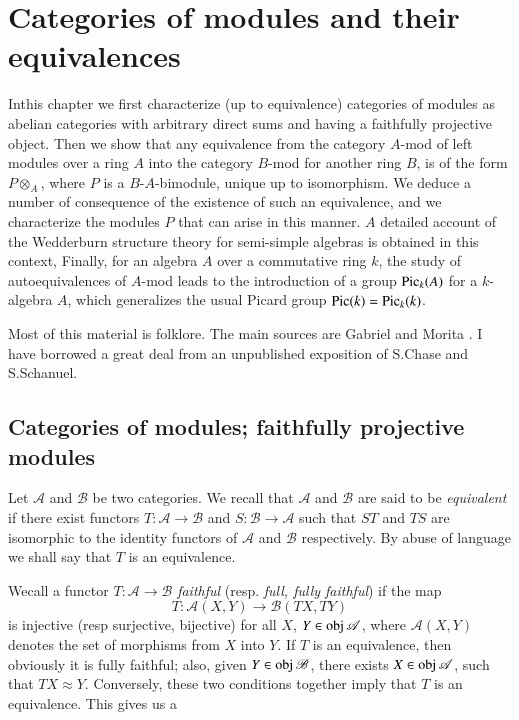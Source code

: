  \chapter{Categories of modules and their equivalences}\label{chap2}
  
In\pageoriginale this chapter we first characterize (up to
equivalence) categories 
of modules as abelian categories  with arbitrary direct sums and
having a faithfully projective object. Then we show that any
equivalence from the category $A$-mod of left modules over a ring
$A$ into  the category $B$-mod for another ring $B$, is of the form
$P \otimes_A$, where $P$ is a $B$-$A$-bimodule, unique up to
isomorphism. We deduce a number of consequence of the existence of
such an equivalence, and we characterize the modules $P$ that can
arise in this manner. $A$ detailed account of the Wedderburn
structure theory for semi-simple algebras is obtained in this
context, Finally, for an algebra $A$ over a commutative ring $k$,
the study of autoequivalences of $A$-mod leads to the introduction
of a group $\operatorname{Pic}_k (A)$ for a $k$-algebra $A$, which  generalizes
the usual Picard group  $\operatorname{Pic} (k) = \operatorname{Pic}_k(k)$. 
  
  Most of this material is folklore. The main sources are Gabriel \cite{key1}
  and Morita \cite{key1}. I have borrowed a great deal from an unpublished
  exposition of S.Chase and S.Schanuel. 
  

  \section{Categories of modules; faithfully projective modules}%
  
  Let $\mathscr{A}$ and $\mathscr{B}$ be two categories. We recall
  that $\mathscr{A}$ and $\mathscr{B}$ are said to be
  \textit{equivalent} if there exist functors $T:\mathscr{A} \to
  \mathscr{B}$ and $S: \mathscr{B} \to \mathscr{A}$ such that $ST$ and
  $TS$ are isomorphic to the identity functors of $\mathscr{A}$ and
  $\mathscr{B}$ respectively. By abuse of language we shall say that
  $T$ is an equivalence. 


  We\pageoriginale call  a functor $T: \mathscr{A} \to \mathscr{B}$
  \textit{faithful} (resp. \textit{full, fully faithful}) if the map 
  \begin{equation*}
T: \mathscr{A} (X, Y) \to \mathscr{B} (TX, TY)  \tag{1.1}  
   \end{equation*}   
   is injective (resp surjective, bijective) for all $X$, $Y \in \operatorname{obj}
   \mathscr{A}$, where $\mathscr{A} (X,Y)$ denotes the set of
   morphisms from $X$ into  $Y$. If $T$ is an equivalence, then
   obviously it is fully faithful; also, given $Y \in \operatorname{obj}
   \mathscr{B}$, there exists $X \in \operatorname{obj} \mathscr{A}$, such that $TX
   \approx Y$. Conversely, these two conditions together imply that
   $T$ is an equivalence. This gives us a 
   
